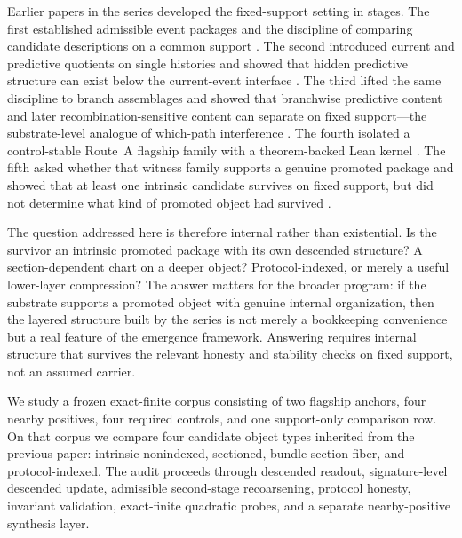 \documentclass[11pt]{article}
\theoremstyle{definition}
\begin{document}
Earlier papers in the series developed the fixed-support setting in stages. The first established admissible event packages and the discipline of comparing candidate descriptions on a common support \cite{Tsiokos2026EventPackages}. The second introduced current and predictive quotients on single histories and showed that hidden predictive structure can exist below the current-event interface \cite{Tsiokos2026PredictiveQuotients}. The third lifted the same discipline to branch assemblages and showed that branchwise predictive content and later recombination-sensitive content can separate on fixed support---the substrate-level analogue of which-path interference \cite{Tsiokos2026MarkingErasure}. The fourth isolated a control-stable Route~A flagship family with a theorem-backed Lean kernel \cite{Tsiokos2026RecombinationWitnesses}. The fifth asked whether that witness family supports a genuine promoted package and showed that at least one intrinsic candidate survives on fixed support, but did not determine what kind of promoted object had survived \cite{Tsiokos2026PromotionCriteria}.

The question addressed here is therefore internal rather than existential. Is the survivor an intrinsic promoted package with its own descended structure? A section-dependent chart on a deeper object? Protocol-indexed, or merely a useful lower-layer compression? The answer matters for the broader program: if the substrate supports a promoted object with genuine internal organization, then the layered structure built by the series is not merely a bookkeeping convenience but a real feature of the emergence framework. Answering requires internal structure that survives the relevant honesty and stability checks on fixed support, not an assumed carrier.

We study a frozen exact-finite corpus consisting of two flagship anchors, four nearby positives, four required controls, and one support-only comparison row. On that corpus we compare four candidate object types inherited from the previous paper: intrinsic nonindexed, sectioned, bundle-section-fiber, and protocol-indexed. The audit proceeds through descended readout, signature-level descended update, admissible second-stage recoarsening, protocol honesty, invariant validation, exact-finite quadratic probes, and a separate nearby-positive synthesis layer.
\end{document}
